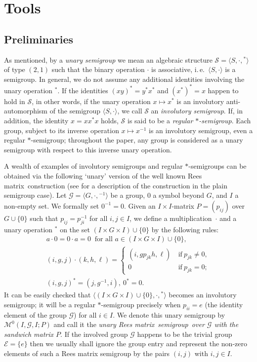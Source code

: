 \documentclass[11pt,reqno]{amsart}
\numberwithin{equation}{section}
\theoremstyle{remark}
\def\cal{\mathcal}
\def\Mc{{\cal M}}
\def\Rm{Rees matrix}
\def\sm{semi\-group}
\begin{document}
\section{Tools}\label{mainresult}

\subsection{Preliminaries}
As mentioned, by a \emph{unary semigroup} we mean an algebraic
structure $\mathcal{S}=\langle S,\cdot,{}^*\rangle$ of type
$(2,1)$ such that the binary operation $\cdot$ is associative,
i.\,e.\ $\langle S,\cdot\rangle$ is a semigroup. In general, we do
not assume any additional identities involving the unary operation
${}^*$. If the identities $(xy)^* = y^*x^*$ and $(x^*)^* = x$
happen to hold in $\mathcal{S}$, in other words, if the unary
operation $x\mapsto x^*$ is an involutory anti-automorphism of the
semigroup $\langle S,\cdot\rangle$, we call $\mathcal{S}$ an
\emph{involutory semigroup}. If, in addition, the identity
$x=xx^*x$ holds, $\mathcal{S}$ is said to be a \emph{regular
$*$-semigroup}. Each group, subject to its inverse operation
$x\mapsto x^{-1}$ is an involutory semigroup, even a regular
$*$-semigroup; throughout the paper, any group is considered as a
unary semigroup with respect to this inverse unary operation.

A wealth of examples of involutory semigroups and regular
$*$-semigroups can be obtained via the following `unary' version
of the well known \Rm\ construction (see \cite[Section~3.1]{CP}
for a description of the construction in the plain semigroup
case). Let $\mathcal{G}=\langle G,\cdot,{}^{-1}\rangle$ be a
group, $0$ a symbol beyond $G$, and $I$ a non-empty set. We
formally set $0^{-1}=0$. Given an $I\times I$-matrix $P=(p_{ij})$
over $G\cup\{0\}$ such that $p_{ij}=p_{ji}^{-1}$ for all $i,j\in
I$, we define a multiplication~$\cdot$ and a unary operation
${}^*$ on the set $(I\times G\times I)\cup\{0\}$ by the following
rules:
\begin{gather*}
a\cdot 0=0\cdot a=0\ \text{ for all $a\in (I\times G\times I)\cup \{0\}$},\\
(i,g,j)\cdot(k,h,\ell)=\left\{\begin{array}{cl}
(i,gp_{jk}h,\ell)&\ \text{if}\ p_{jk}\ne0,\\
0 &\ \text{if}\ p_{jk}=0;
\end{array}\right.\\
(i,g,j)^* = (j,g^{-1},i),\ 0^* = 0.
\end{gather*}
It can be easily checked that $\langle(I\times G\times I)\cup
\{0\},\cdot,{}^*\rangle$ becomes  an involutory semigroup; it will
be a regular $*$-semigroup precisely when $p_{ii}=e$ (the identity
element of the group $\mathcal{G}$) for all $i\in I$. We denote
this unary semigroup  by $\Mc^0(I,\mathcal{G},I;P)$ and call it
the \emph{unary \Rm\ \sm\ over $\mathcal{G}$ with the sandwich
matrix $P$}. If the involved group $\mathcal G$ happens to be the
trivial group $\mathcal{E}=\{e\}$ then we usually shall ignore the
group entry and represent the non-zero elements of such a Rees
matrix semigroup by the pairs $(i,j)$ with $i,j\in I$.
\end{document}
